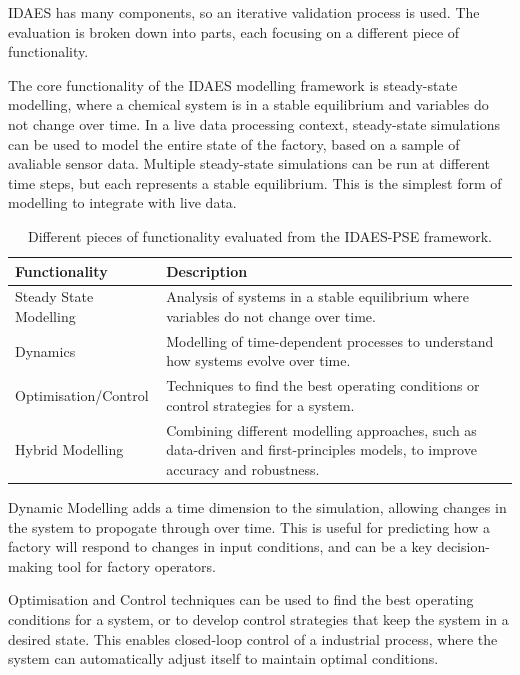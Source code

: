 \documentclass[12pt]{article}
\begin{document}
IDAES has many components, so an iterative validation process is used. The evaluation is broken down into parts, each focusing on a different piece of functionality. 

The core functionality of the IDAES modelling framework is steady-state modelling, where a chemical system is in a stable equilibrium and variables do not change over time. In a live data processing context, steady-state simulations can be used to model the entire state of the factory, based on a sample of avaliable sensor data. Multiple steady-state simulations can be run at different time steps, but each represents a stable equilibrium. This is the simplest form of modelling to integrate with live data. 

\begin{table}[h]
    \centering
    \begin{tabular}{|l|p{10cm}|}
        \hline
        \textbf{Functionality} & \textbf{Description} \\
        \hline
        Steady State Modelling & Analysis of systems in a stable equilibrium where variables do not change over time. \\
        \hline
        Dynamics & Modelling of time-dependent processes to understand how systems evolve over time. \\
        \hline
        Optimisation/Control & Techniques to find the best operating conditions or control strategies for a system. \\
        \hline
        Hybrid Modelling & Combining different modelling approaches, such as data-driven and first-principles models, to improve accuracy and robustness. \\
        \hline
    \end{tabular}
    \caption{Different pieces of functionality evaluated from the IDAES-PSE framework.}
    \label{tab:functionality}
\end{table}

Dynamic Modelling adds a time dimension to the simulation, allowing changes in the system to propogate through over time. This is useful for predicting how a factory will respond to changes in input conditions, and can be a key decision-making tool for factory operators.

Optimisation and Control techniques can be used to find the best operating conditions for a system, or to develop control strategies that keep the system in a desired state. This enables closed-loop control of a industrial process, where the system can automatically adjust itself to maintain optimal conditions.
\end{document}

